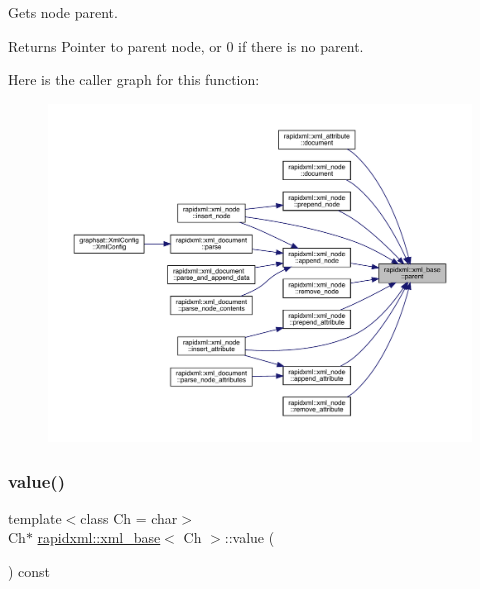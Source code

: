 Gets node parent. \begin{DoxyReturn}{Returns}
Pointer to parent node, or 0 if there is no parent. 
\end{DoxyReturn}
Here is the caller graph for this function\+:\nopagebreak
\begin{figure}[H]
\begin{center}
\leavevmode
\includegraphics[width=350pt]{classrapidxml_1_1xml__base_aa807062868d671a8c798d9d1bf016988_icgraph}
\end{center}
\end{figure}
\mbox{\label{classrapidxml_1_1xml__base_a6af65de5e59ac497cd69838f8a89d602}} 
\subsubsection{\texorpdfstring{value()}{value()}\hspace{0.1cm}{\footnotesize\ttfamily [1/3]}}
{\footnotesize\ttfamily template$<$class Ch  = char$>$ \\
Ch$\ast$ \mbox{\hyperlink{classrapidxml_1_1xml__base}{rapidxml\+::xml\+\_\+base}}$<$ Ch $>$\+::value (\begin{DoxyParamCaption}{ }\end{DoxyParamCaption}) const\hspace{0.3cm}{\ttfamily [inline]}}

